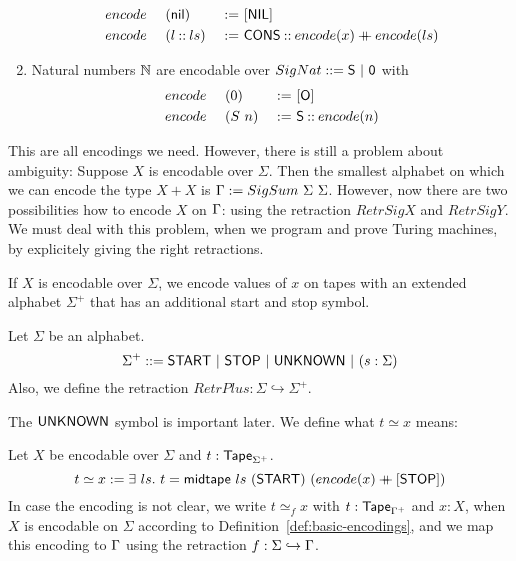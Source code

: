 \begin{definition}
\begin{enumerate}
    \begin{alignat*}{3}
      &encode~&&(\textsf{nil}      ) &~:=~& [\textsf{NIL}] \\
      &encode~&&(l \mathbin{::} ls) &~:=~& \textsf{CONS} \mathbin{::} encode(x) \mathbin{+\mkern-10mu+} encode(ls)
    \end{alignat*}
  \item Natural numbers $\mathbb{N}$ are encodable over $ SigNat ::= \textsf{S} ~|~ \textsf{0} $ with
    \begin{alignat*}{3}
      &encode~&&(0  ) &~:=~& [\textsf{O}] \\
      &encode~&&(S~n) &~:=~& \textsf{S} \mathbin{::} encode(n)
    \end{alignat*}
  \end{enumerate}
\end{definition}


This are all encodings we need.  However, there is still a problem about ambiguity: Suppose $X$ is encodable over $\Sigma$.  Then the smallest
alphabet on which we can encode the type $X+X$ is $\Gamma := SigSum~\Sigma~\Sigma$.  However, now there are two possibilities how to encode $X$ on
$\Gamma$: using the retraction $RetrSigX$ and $RetrSigY$.  We must deal with this problem, when we program and prove Turing machines, by explicitely
giving the right retractions.

If $X$ is encodable over $\Sigma$, we encode values of $x$ on tapes with an extended alphabet $\Sigma^+$ that has an additional start and stop symbol.
\begin{definition}[$\Sigma^+$] Let $\Sigma$ be an alphabet.
  \[
    \Sigma^+ ::= \textsf{START} ~|~ \textsf{STOP} ~|~ \textsf{UNKNOWN} ~|~ (s: \Sigma)
  \]
  Also, we define the retraction $RetrPlus : \Sigma \hookrightarrow \Sigma^+$.
\end{definition}
The $\textsf{UNKNOWN}$ symbol is important later. We define what $t \simeq x$ means:
\begin{definition}[$t \simeq x$]
  \label{def:tape_contains}
  Let $X$ be encodable over $\Sigma$ and $t : \textsf{Tape}_{\Sigma^+}$.
  \[
    t \simeq x := \exists~ls.~
    t = \textsf{midtape}~ls~(\textsf{START})~(encode(x) \mathbin{+\mkern-10mu+} [\textsf{STOP}])
  \]
  In case the encoding is not clear, we write $t \simeq_{f} x$ with $t:\textsf{Tape}_{\Gamma^+}$ and $x:X$, when $X$ is encodable on $\Sigma$ according to
  Definition~\ref{def:basic-encodings}, and we map this encoding to $\Gamma$ using the retraction $f: \Sigma \hookrightarrow \Gamma$.
\end{definition}

